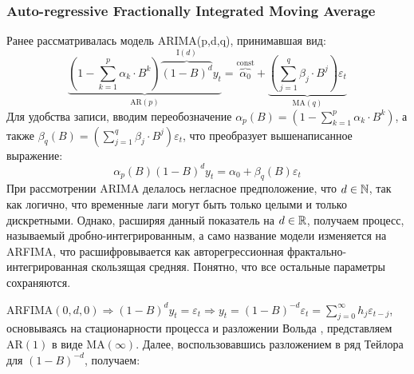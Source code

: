 \subsubsection{Auto-regressive Fractionally Integrated Moving Average}
Ранее рассматривалась модель ARIMA(p,d,q), принимавшая вид:
\begin{equation}
	\underbrace{\left(1 - \sum_{k = 1}^{p} \alpha_k \cdot B^k\right) \overbrace{(1 - B)^d}^{\text{I}(d)} y_t}_{\text{AR}(p)} = \overbrace{\alpha_0}^{\text{const}} + \underbrace{\left(\sum_{j = 1}^{q} \beta_j \cdot B^j\right) \varepsilon_{t}}_{\text{MA}(q)}
\end{equation}
Для удобства записи, вводим переобозначение $\alpha_p(B) = \left(1 - \sum_{k = 1}^{p} \alpha_k \cdot B^k\right)$, а также $\beta_{q}(B) = \left(\sum_{j = 1}^{q} \beta_j \cdot B^j\right) \varepsilon_{t}$, что преобразует вышенаписанное выражение:
\begin{equation}
	\alpha_p(B) (1 - B)^d y_t = \alpha_0 + \beta_{q}(B) \varepsilon_{t}
\end{equation}
При рассмотрении ARIMA делалось негласное предположение, что $d \in \mathbb{N}$, так как логично, что временные лаги могут быть только целыми и только дискретными. Однако, расширяя данный показатель \cite{fractal_market} на $d \in \mathbb{R}$, получаем процесс, называемый дробно-интегрированным, а само название модели изменяется на ARFIMA, что расшифровывается как авторегрессионная фрактально-интегрированная скользящая средняя. Понятно, что все остальные параметры сохраняются.

ARFIMA$(0, d, 0) \Rightarrow (1 - B)^{d}y_t = \varepsilon_{t} \Rightarrow y_t = (1 - B)^{-d}\varepsilon_t = \sum_{j = 0}^{\infty} h_j\varepsilon_{t - j}$, основываясь на стационарности процесса и разложении Вольда \cite{wold_decomposition}, представляем AR$(1)$ в виде MA$(\infty)$. Далее, воспользовавшись разложением в ряд Тейлора для $(1 - B)^{-d}$, получаем:

